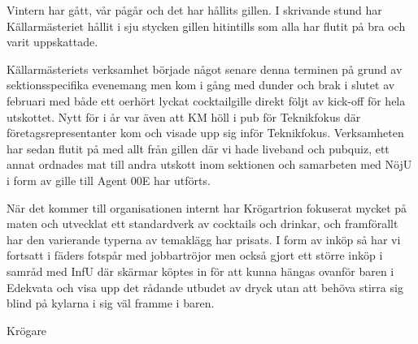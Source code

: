 \documentclass[../_main/handlingar.tex]{subfiles}
\begin{document}
Vintern har gått, vår pågår och det har hållits gillen. I skrivande stund har Källarmästeriet hållit i sju stycken gillen hitintills som alla har flutit på bra och varit uppskattade.

Källarmästeriets verksamhet började något senare denna terminen på grund av sektionsspecifika evenemang men kom i gång med dunder och brak i slutet av februari med både ett oerhört lyckat cocktailgille direkt följt av kick-off för hela utskottet. Nytt för i år var även att KM höll i pub för Teknikfokus där företagsrepresentanter kom och visade upp sig inför Teknikfokus. Verksamheten har sedan flutit på med allt från gillen där vi hade liveband och pubquiz, ett annat ordnades mat till andra utskott inom sektionen och samarbeten med NöjU i form av gille till Agent 00E har utförts.

När det kommer till organisationen internt har Krögartrion fokuserat mycket på maten och utvecklat ett standardverk av cocktails och drinkar, och framförallt har den varierande typerna av temaklägg har prisats. I form av inköp så har vi fortsatt i fäders fotspår med jobbartröjor men också gjort ett större inköp i samråd med InfU där skärmar köptes in för att kunna hängas ovanför baren i Edekvata och visa upp det rådande utbudet av dryck utan att behöva stirra sig blind på kylarna i sig väl framme i baren.


\begin{signatures}{1}
    \mvh
    \signature{Markus Rahne}{Krögare}
\end{signatures}
\end{document}
